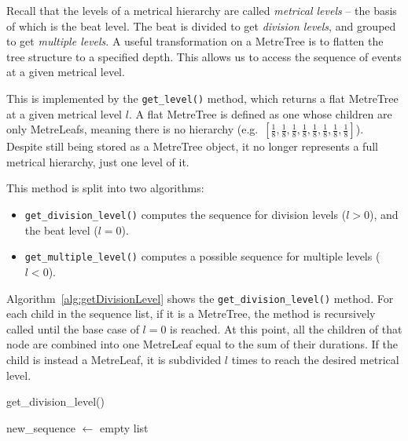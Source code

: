 \documentclass[12pt,twoside,openright]{report}
\begin{document}
Recall that the levels of a metrical hierarchy are called \emph{metrical levels} -- the basis of which is the beat level. The beat is divided to get \emph{division levels}, and grouped to get \emph{multiple levels}. A useful transformation on a MetreTree is to flatten the tree structure to a specified depth. This allows us to access the sequence of events at a given metrical level.

This is implemented by the \verb'get_level()' method, which returns a flat MetreTree at
a given metrical level $l$. A flat MetreTree is defined as one whose children are
only MetreLeafs, meaning there is no hierarchy (e.g.\ $\left[\frac{1}{8},\frac{1}{8},\frac{1}{8},\frac{1}{8},\frac{1}{8},\frac{1}{8},\frac{1}{8},\frac{1}{8}\right]$). Despite still being stored as a MetreTree object, it no longer represents a full metrical hierarchy, just one level of it.

This method is split into two algorithms:
\begin{itemize}
    \item \verb'get_division_level()' computes the sequence for division levels ($l>0$), and the beat level ($l=0$).
	\item \verb'get_multiple_level()' computes a possible sequence for multiple levels ($l<0$).
\end{itemize}

Algorithm~\ref{alg:getDivisionLevel} shows the \verb'get_division_level()' method. For each child in the
sequence list, if it is a MetreTree, the method is recursively called until the
base case of $l=0$ is reached. At this point, all the children of that node are
combined into one MetreLeaf equal to the sum of their durations. If the child is
instead a MetreLeaf, it is subdivided $l$ times to reach the desired metrical
level.

\begin{algorithm}[H]

    \caption{get\_division\_level()}
    \BlankLine

    new\_sequence $\gets$ empty list\;
    \label{alg:getDivisionLevel}
\end{algorithm}
\end{document}
